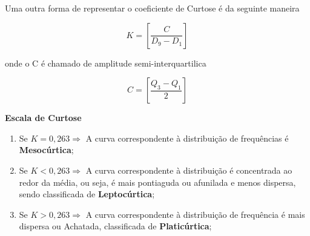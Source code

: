 \vskip0.3cm
Uma outra forma de representar o coeficiente de Curtose é da seguinte maneira

\begin{equation}\label{curtose2}
    K= \left[ \frac{C}{D_{9}-D_{1}} \right]
\end{equation}

onde o C é chamado de amplitude semi-interquartilica

\begin{equation}\label{curtose2}
    C= \left[ \frac{Q_{3}-Q_{1}}{2} \right]
\end{equation}


\textbf{Escala de Curtose}

\begin{enumerate}
\item Se $K = 0,263 \Rightarrow$  A curva correspondente à distribuição de frequências é \textbf{Mesocúrtica};
\item Se $K < 0,263 \Rightarrow$  A curva correspondente à distribuição é concentrada ao redor da média, ou seja, é mais pontiaguda ou afunilada e menos dispersa, sendo classificada de \textbf{Leptocúrtica};
\item Se $K > 0,263 \Rightarrow$ A curva correspondente à distribuição de frequência é mais dispersa ou Achatada, classificada de \textbf{Platicúrtica};
\end{enumerate}
